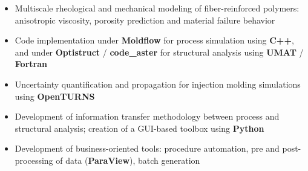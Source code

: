 \documentclass[10pt,a4paper]{altacv}
\begin{document}

\begin{fullwidth}
\makecvheader
\end{fullwidth}



\begin{itemize}
\item Multiscale rheological and mechanical modeling of fiber-reinforced polymers: anisotropic viscosity, porosity prediction and material failure behavior
\item Code implementation under \textbf{Moldflow} for process simulation using \textbf{C++}, and under \textbf{Optistruct} / \textbf{code\_aster} for structural analysis using \textbf{UMAT} / \textbf{Fortran}
\item Uncertainty quantification and propagation for injection molding simulations using \textbf{OpenTURNS}
\item Development of information transfer methodology between process and structural analysis; creation of a GUI-based toolbox using \textbf{Python}
\item Development of business-oriented tools: procedure automation, pre and post-processing of data (\textbf{ParaView}), batch generation
\end{itemize}

\divider
\end{document}
